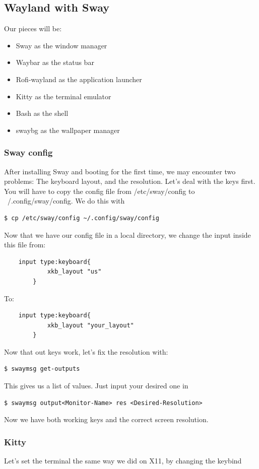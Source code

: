 \subsection{Wayland with Sway}
Our pieces will be:
\begin{itemize}
    \item Sway as the window manager
    \item Waybar as the status bar
    \item Rofi-wayland as the application launcher
    \item Kitty as the terminal emulator
    \item Bash as the shell
    \item swaybg as the wallpaper manager
\end{itemize}

\subsubsection{Sway config}

After installing Sway and booting for the first time, we may encounter two problems: The keyboard layout, and the resolution.
Let's deal with the keys first. You will have to copy the config file from /etc/sway/config to ~/.config/sway/config. We do this with
\begin{lstlisting}
$ cp /etc/sway/config ~/.config/sway/config
\end{lstlisting}

\pagebreak

Now that we have our config file in a local directory, we change the input inside this file from:
\begin{lstlisting}
    input type:keyboard{
            xkb_layout "us"
        }
\end{lstlisting}
To:
\begin{lstlisting}
    input type:keyboard{
            xkb_layout "your_layout"
        }
\end{lstlisting}

Now that out keys work, let's fix the resolution with:
\begin{lstlisting}
$ swaymsg get-outputs
\end{lstlisting}

This gives us a list of values. Just input your desired one in

\begin{lstlisting}
$ swaymsg output<Monitor-Name> res <Desired-Resolution> 
\end{lstlisting}

Now we have both working keys and the correct screen resolution.

\subsubsection{Kitty}
Let's set the terminal the same way we did on X11, by changing the keybind
